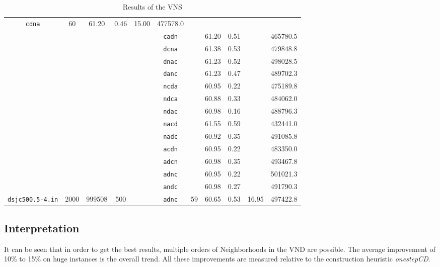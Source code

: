 \documentclass[paper=a4,fontsize=12pt]{scrartcl}
\begin{document}
\begin{table}[p]
\begin{tabular}{|c|ccc|c|c|ccc|c|c|}
      \texttt{cdna}	& \multirow{14}{*}{60}	& 61.20	& 0.46	& \multirow{14}{*}{15.00}	& 477578.0\\
&&&&& \texttt{cadn}	&			& 61.20	& 0.51	&				& 465780.5\\
&&&&& \texttt{dcna}	&			& 61.38	& 0.53	&				& 479848.8\\
&&&&& \texttt{dnac}	&			& 61.23	& 0.52	&				& 498028.5\\
&&&&& \texttt{danc}	&			& 61.23	& 0.47	&				& 489702.3\\
&&&&& \texttt{ncda}	&			& 60.95	& 0.22	&				& 475189.8\\
&&&&& \texttt{ndca}	&			& 60.88	& 0.33	&				& 484062.0\\
&&&&& \texttt{ndac}	&			& 60.98	& 0.16	&				& 488796.3\\
&&&&& \texttt{nacd}	&			& 61.55	& 0.59	&				& 432441.0\\
&&&&& \texttt{nadc}	&			& 60.92	& 0.35	&				& 491085.8\\
&&&&& \texttt{acdn}	&			& 60.95	& 0.22	&				& 483350.0\\
&&&&& \texttt{adcn}	&			& 60.98	& 0.35	&				& 493467.8\\
&&&&& \texttt{adnc}	&			& 60.95	& 0.22	&				& 501021.3\\
&&&&& \texttt{andc}	&			& 60.98	& 0.27	&				& 491790.3\\
\cline{1-4}\cline{6-11}
\texttt{dsjc500.5-4.in} & 2000 & 999508 & 500 & & \texttt{adnc} & 59 & 60.65 & 0.53 & 16.95 & 497422.8\\
\hline
\end{tabular}
\caption{Results of the VNS}
\label{tab:result}
\end{table}

\subsection{Interpretation}
It can be seen that in order to get the best results, multiple orders of Neighborhoods in the VND are possible. The average improvement of 10\% to 15\% on huge instances is the overall trend. All these improvements are measured relative to the construction heuristic \emph{onestepCD}.

\end{document}
